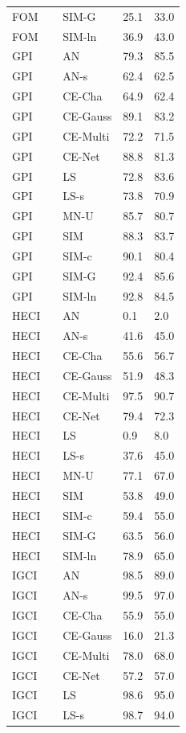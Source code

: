 \begin{tabular}{lllll}
FOM &  & SIM-G & 25.1 & 33.0 \\
FOM &  & SIM-ln & 36.9 & 43.0 \\
GPI &  & AN & 79.3 & 85.5 \\
GPI &  & AN-s & 62.4 & 62.5 \\
GPI &  & CE-Cha & 64.9 & 62.4 \\
GPI &  & CE-Gauss & 89.1 & 83.2 \\
GPI &  & CE-Multi & 72.2 & 71.5 \\
GPI &  & CE-Net & 88.8 & 81.3 \\
GPI &  & LS & 72.8 & 83.6 \\
GPI &  & LS-s & 73.8 & 70.9 \\
GPI &  & MN-U & 85.7 & 80.7 \\
GPI &  & SIM & 88.3 & 83.7 \\
GPI &  & SIM-c & 90.1 & 80.4 \\
GPI &  & SIM-G & 92.4 & 85.6 \\
GPI &  & SIM-ln & 92.8 & 84.5 \\
HECI &  & AN & 0.1 & 2.0 \\
HECI &  & AN-s & 41.6 & 45.0 \\
HECI &  & CE-Cha & 55.6 & 56.7 \\
HECI &  & CE-Gauss & 51.9 & 48.3 \\
HECI &  & CE-Multi & 97.5 & 90.7 \\
HECI &  & CE-Net & 79.4 & 72.3 \\
HECI &  & LS & 0.9 & 8.0 \\
HECI &  & LS-s & 37.6 & 45.0 \\
HECI &  & MN-U & 77.1 & 67.0 \\
HECI &  & SIM & 53.8 & 49.0 \\
HECI &  & SIM-c & 59.4 & 55.0 \\
HECI &  & SIM-G & 63.5 & 56.0 \\
HECI &  & SIM-ln & 78.9 & 65.0 \\
IGCI &  & AN & 98.5 & 89.0 \\
IGCI &  & AN-s & 99.5 & 97.0 \\
IGCI &  & CE-Cha & 55.9 & 55.0 \\
IGCI &  & CE-Gauss & 16.0 & 21.3 \\
IGCI &  & CE-Multi & 78.0 & 68.0 \\
IGCI &  & CE-Net & 57.2 & 57.0 \\
IGCI &  & LS & 98.6 & 95.0 \\
IGCI &  & LS-s & 98.7 & 94.0 \\

\end{tabular}
